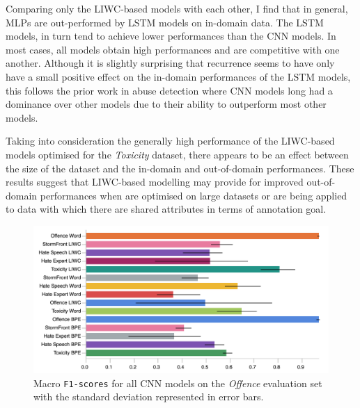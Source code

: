 Comparing only the LIWC-based models with each other, I find that in general, MLPs are out-performed by LSTM models on in-domain data.
The LSTM models, in turn tend to achieve lower performances than the CNN models.
In most cases, all models obtain high performances and are competitive with one another.
Although it is slightly surprising that recurrence seems to have only have a small positive effect on the in-domain performances of the LSTM models, this follows the prior work in abuse detection where CNN models long had a dominance over other models due to their ability to outperform most other models.

Taking into consideration the generally high performance of the LIWC-based models optimised for the \textit{Toxicity} dataset, there appears to be an effect between the size of the dataset and the in-domain and out-of-domain performances.
These results suggest that LIWC-based modelling may provide for improved out-of-domain performances when  are optimised on large datasets or  are being applied to data with which there are shared attributes in terms of annotation goal.

\begin{figure}
\centering
    \includegraphics[width=\textwidth]{all_cnn_davidson_test.pdf}
    \caption{Macro \texttt{F1-scores} for all CNN models on the \textit{Offence} evaluation set with the standard deviation represented in error bars.}
    \label{fig:davidson_cnn_test}
\end{figure}

